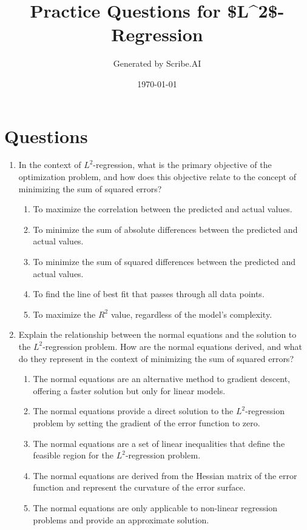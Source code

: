 \documentclass{article}%
\title{Practice Questions for \$L\^{}2\${-}Regression}%
\author{Generated by Scribe.AI}%
\date{\today}%
\begin{document}
%
\normalsize%
\maketitle%
\section{Questions}%
\label{sec:Questions}%
\begin{enumerate}%
\item In the context of $L^2$-regression, what is the primary objective of the optimization problem, and how does this objective relate to the concept of minimizing the sum of squared errors?%
\begin{enumerate}%
\item To maximize the correlation between the predicted and actual values.%
\item To minimize the sum of absolute differences between the predicted and actual values.%
\item To minimize the sum of squared differences between the predicted and actual values.%
\item To find the line of best fit that passes through all data points.%
\item To maximize the $R^2$ value, regardless of the model's complexity.%
\end{enumerate}%
\vspace{1em}%
\item Explain the relationship between the normal equations and the solution to the $L^2$-regression problem.  How are the normal equations derived, and what do they represent in the context of minimizing the sum of squared errors?%
\begin{enumerate}%
\item The normal equations are an alternative method to gradient descent, offering a faster solution but only for linear models.%
\item The normal equations provide a direct solution to the $L^2$-regression problem by setting the gradient of the error function to zero.%
\item The normal equations are a set of linear inequalities that define the feasible region for the $L^2$-regression problem.%
\item The normal equations are derived from the Hessian matrix of the error function and represent the curvature of the error surface.%
\item The normal equations are only applicable to non-linear regression problems and provide an approximate solution.%

\end{enumerate}
\end{enumerate}
\end{document}
